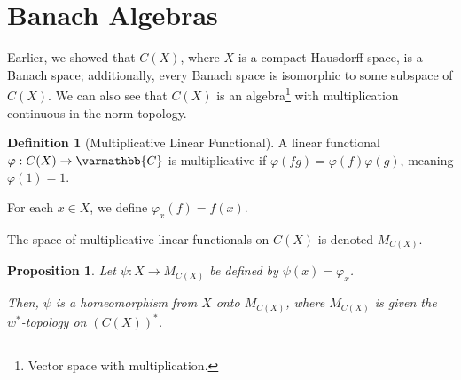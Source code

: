 \documentclass[10pt]{extarticle}
\newcommand{\C}{\mathbb{C}}
\theoremstyle{plain}
\newtheorem*{proposition}{Proposition}
\theoremstyle{definition}
\newtheorem*{definition}{Definition}
\theoremstyle{note}
\renewcommand*{\mathbb}[1]{\varmathbb{#1}}
\renewcommand{\newline}{\hfill\break}
\begin{document}
\section{Banach Algebras}%
Earlier, we showed that $C(X)$, where $X$ is a compact Hausdorff space, is a Banach space; additionally, every Banach space is isomorphic to some subspace of $C(X)$. We can also see that $C(X)$ is an algebra\footnote{Vector space with multiplication.} with multiplication continuous in the norm topology.
\begin{definition}[Multiplicative Linear Functional]
  A linear functional $\varphi: C(X) \rightarrow \C$ is multiplicative if $\varphi(fg) = \varphi(f)\varphi(g)$, meaning $\varphi(1) = 1$.\newline

  For each $x\in X$, we define $\varphi_x(f) = f(x)$.\newline

  The space of multiplicative linear functionals on $C(X)$ is denoted $M_{C(X)}$.
\end{definition}
\begin{proposition}
  Let $\psi: X\rightarrow M_{C(X)}$ be defined by $\psi(x) = \varphi_x$.\newline

  Then, $\psi$ is a homeomorphism from $X$ onto $M_{C(X)}$, where $M_{C(X)}$ is given the $w^{\ast}$-topology on $\left(C(X)\right)^{\ast}$.
\end{proposition}
\end{document}
